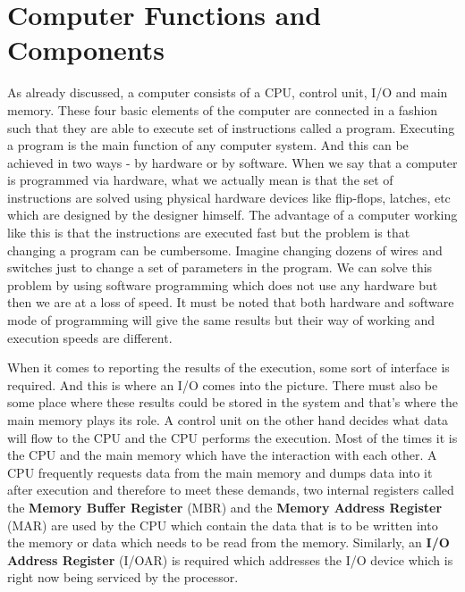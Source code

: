 \documentclass{article}
\begin{document}
\section{Computer Functions and Components}
As already discussed, a computer consists of a CPU, control unit, I/O and main memory. These four basic elements of the computer are connected in a fashion such that they are able to execute set of instructions called a program. Executing a program is the main function of any computer system. And this can be achieved in two ways - by hardware or by software. When we say that a computer is programmed via hardware, what we actually mean is that the set of instructions are solved using physical hardware devices like flip-flops, latches, etc which are designed by the designer himself. The advantage of a computer working like this is that the instructions are executed fast but the problem is that changing a program can be cumbersome. Imagine changing dozens of wires and switches just to change a set of parameters in the program. We can solve this problem by  using software programming which does not use any hardware but then we are at a loss of speed. It must be noted that both hardware and software mode of programming will give the same results but their way of working and execution speeds are different.
\par When it comes to reporting the results of the execution, some sort of interface is required. And this is where an I/O comes into the picture. There must also be some place where these results could be stored in the system and that's where the main memory plays its role. A control unit on the other hand decides what data will flow to the CPU and the CPU performs the execution. Most of the times it is the CPU and the main memory which have the interaction with each other. A CPU frequently requests data from the main memory and dumps data into it after execution and therefore to meet these demands, two internal registers called the \textbf{Memory Buffer Register} (MBR) and the \textbf{Memory Address Register} (MAR) are used by the CPU which contain the data that is to be written into the memory or data which needs to be read from the memory. Similarly, an \textbf{I/O Address Register} (I/OAR) is required which addresses the I/O device which is right now being serviced by the processor.
\end{document}
